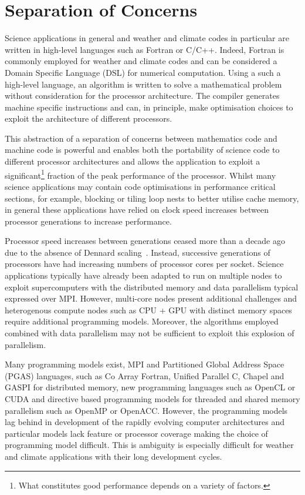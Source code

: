 \documentclass[times]{elsarticle}
\begin{document}
\section{\label{sec:SoC}Separation of Concerns}
Science applications in general and weather and climate codes in
particular are written in high-level languages such as Fortran or
C/C++. Indeed, Fortran is commonly employed for weather and climate
codes and can be considered a Domain Specific Language (DSL) for
numerical computation. Using a such a high-level language, an
algorithm is written to solve a mathematical problem without
consideration for the processor architecture. The compiler generates
machine specific instructions and can, in principle, make optimisation
choices to exploit the architecture of different processors.

This abstraction of a separation of concerns between mathematics code
and machine code is powerful and enables both the portability of
science code to different processor architectures and allows the
application to exploit a significant\footnote{What constitutes good
  performance depends on a variety of factors.} fraction of the peak
performance of the processor. Whilst many science applications may
contain code optimisations in performance critical sections, for
example, blocking or tiling loop nests to better utilise cache memory,
in general these applications have relied on clock
speed increases between processor generations to increase performance.

Processor speed increases between generations ceased more than a decade
ago due to the absence of Dennard scaling~\cite{dennard}. Instead,
successive generations of processors have had increasing numbers of processor cores per
socket. Science applications typically have already been adapted to run on multiple
nodes to exploit supercomputers with the distributed memory and data parallelism
typical expressed over MPI. However, multi-core nodes present
additional challenges and heterogenous compute nodes such as
CPU + GPU with distinct memory spaces require additional programming
models. Moreover, the algorithms employed combined with data
parallelism may not be sufficient to exploit this explosion of parallelism.

Many programming models exist, MPI and Partitioned Global Address
Space (PGAS) languages, such as Co Array Fortran, Unified Parallel C,
Chapel and GASPI for distributed memory, new programming languages such
as OpenCL or CUDA and directive based programming models for threaded
and shared memory parallelism such as OpenMP or OpenACC. However,
the programming models lag behind in development of the rapidly evolving computer
architectures and particular models lack feature or processor coverage
making the choice of programming model difficult. This is ambiguity is
especially difficult for weather and climate applications with their long development
cycles. 
\end{document}

